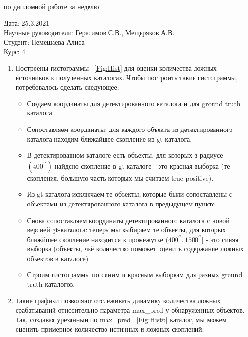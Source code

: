 \documentclass{article}
\begin{document}
\begin{center}{ по дипломной работе за неделю\\}\end{center}
Дата: 25.3.2021\\
Научные руководители: Герасимов С.В., Мещеряков А.В.\\
Студент: Немешаева Алиса\\
Курс: 4\\

\renewcommand{\labelitemi}{$\blacksquare$}
\renewcommand\labelitemii{$\square$}
\begin{enumerate}
    \item Построены гистограммы ~\ref{Fig:Hist}{} для оценки количества ложных источников в 
        полученных каталогах. 
        Чтобы построить такие гистограммы, потребовалось сделать следующее:\\
        \begin{itemize}
            \item Создаем координаты для детектированного каталога и для ground truth каталога.\\
            \item Сопоставляем координаты: для каждого объекта из детектированного каталога находим
                ближайшее скопление из gt-каталога.\\
            \item В детектированном каталоге есть объекты, для которых в радиусе  
                $(400^{\prime \prime})$ найдено скопление в gt-каталоге - это красная выборка (те
                скопления, большую часть которых мы считаем true positive).\\
            \item Из gt-каталога исключаем те объекты, которые были сопоставлены с объектами из
                детектированного каталога в предыдущем пункте.\\
            \item Снова сопоставляем координаты детектированного каталога с новой версией 
                gt-каталога: теперь мы выбираем те объекты, для которых ближйшее скопление 
                находится в промежутке $(400^{\prime \prime}, 1500^{\prime \prime}]$ - это синяя 
                выборка (объекты, чьё количество поможет оценить содержание ложных объектов в 
                каталоге).\\
            \item Строим гистограммы по синим и красным выборкам для разных ground truth каталогов.\\
        \end{itemize}
    \item Такие графики позволяют отслеживать динамику количества ложных срабатываний относительно 
        параметра max\_pred у обнаруженных объектов. Так, создавая урезанный по max\_pred  
        ~\ref{Fig:Hist6} каталог, мы можем оценить примерное количество истинных и ложных 
        скоплений.\\
\end{enumerate}
\end{document}
